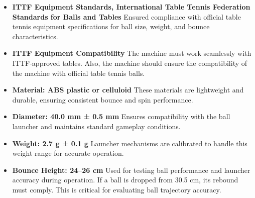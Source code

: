 \documentclass[12pt]{article}
\begin{document}
\begin{itemize}
    \item \textbf{ITTF Equipment Standards, International Table Tennis Federation Standards for Balls and Tables}
    Ensured compliance with official table tennis equipment specifications for ball size, weight, and bounce characteristics.
    
    \item \textbf{ITTF Equipment Compatibility}
    The machine must work seamlessly with ITTF-approved tables. Also, the machine should ensure the compatibility of the machine with official table tennis balls.
    
    \item \textbf{Material: ABS plastic or celluloid}
    These materials are lightweight and durable, ensuring consistent bounce and spin performance.
    
    \item \textbf{Diameter: 40.0 mm ± 0.5 mm}
    Ensures compatibility with the ball launcher and maintains standard gameplay conditions.
    
    \item \textbf{Weight: 2.7 g ± 0.1 g}
    Launcher mechanisms are calibrated to handle this weight range for accurate operation.
    
    \item \textbf{Bounce Height: 24–26 cm}
    Used for testing ball performance and launcher accuracy during operation. If a ball is dropped from 30.5 cm, its rebound must comply. This is critical for evaluating ball trajectory accuracy.
\end{itemize}
\end{document}
